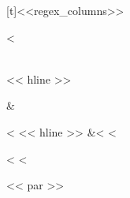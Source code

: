 \documentclass[letterpaper,10pt,english]{sphinxmanual}
\begin{document}
\begin{fulllineitems}
\begin{savenotes}
\begin{tabulary}{\linewidth}[t]{<<regex_columns>>}
\begin{varwidth}[t]{}
<%
\end{varwidth}%
\\
<< hline >>\begin{varwidth}[t]{}
\sphinxstyletheadfamily {}
\sphinxbeforeendvarwidth
\end{varwidth}%
&\begin{varwidth}[t]{}<%
<< hline >>\sphinxstyletheadfamily
{}
&<%
<%
\end{varwidth}%
<%
<%
\end{tabulary}
<< par >>
\sphinxattableend\end{savenotes}

\end{fulllineitems}


\vspace{5px}
\end{document}
